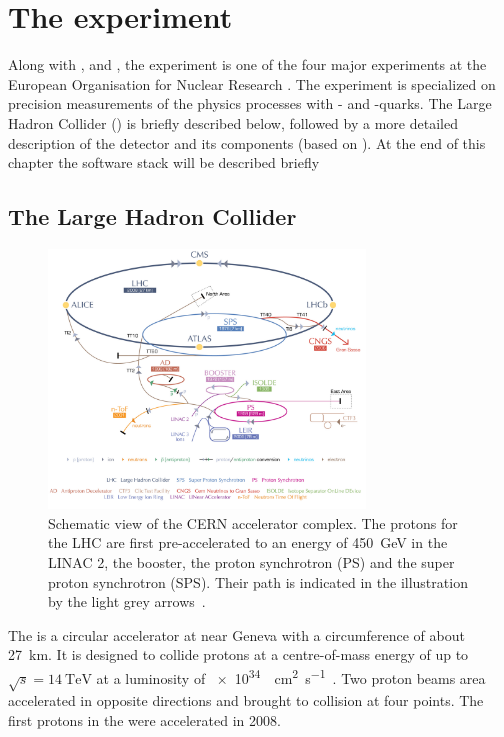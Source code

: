 \chapter{The \lhcb experiment}

Along with \atlas, \cms and \alice, the \lhcb experiment is one of the four major experiments at the European Organisation for Nuclear Research \cern.
The experiment is specialized on precision measurements of the physics processes with \bquark- and \cquark-quarks.
The Large Hadron Collider (\lhc) is briefly described below, followed by a more detailed description of the \lhcb detector and its components (based on \cite{Alves:2008zz}).
At the end of this chapter the \lhcb software stack will be described briefly

\section{The Large Hadron Collider}

\begin{figure}[tbp]
    \centering
    \includegraphics[width=0.75\textwidth]{05lhcb/figs/cern.pdf}
    \caption{Schematic view of the CERN accelerator complex.
    The protons for the LHC are first pre-accelerated to an energy of \SI{450}{\giga\electronvolt} in the LINAC 2, the booster, the proton synchrotron (PS) and the super proton synchrotron (SPS).
    Their path is indicated in the illustration by the light grey arrows~\cite{Christiane:1260465}.}
    \label{fig:CernAccelerators}
\end{figure}
The \lhc is a circular accelerator at \cern near Geneva with a circumference of about \SI{27}{\kilo\metre}.
It is designed to collide protons at a centre-of-mass energy of up to $\sqrt{s} = \SI{14}{\tera\electronvolt}$ at a luminosity of \SI{e34}{\per\cm\squared\per\second}~\cite{Bruening:782076}.
Two proton beams area accelerated in opposite directions and brought to collision at four points.
The first protons in the \lhc were accelerated in \num{2008}.

